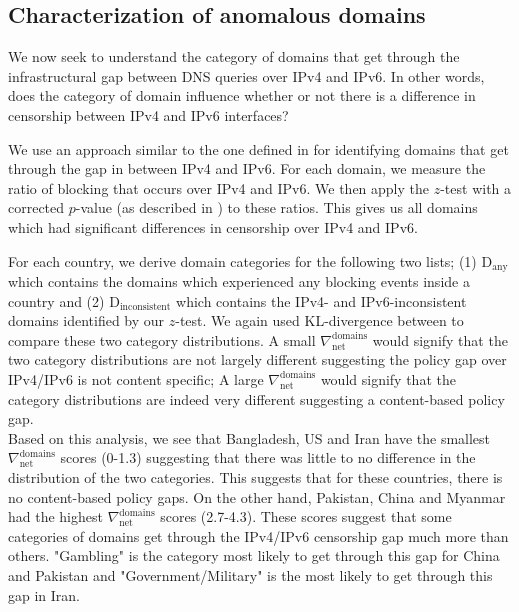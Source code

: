 \subsection{Characterization of anomalous domains}
\label{sec:v4vsv6-infrastructure:domains}
We now seek to understand the category of domains that get through the
infrastructural gap between DNS queries over IPv4 and IPv6. In other words,
does the category of domain influence whether or not there is a difference in
censorship between IPv4 and IPv6 interfaces?

We use an approach similar to the one defined in 
for identifying domains that get through the gap in between IPv4 and IPv6. For
each domain, we measure the ratio of blocking that occurs over IPv4 and IPv6. We
then apply the $z$-test with a corrected $p$-value (as described in
) to these ratios. This gives us all domains which
had significant differences in censorship over IPv4 and IPv6.

For each country, we derive domain categories for the following two lists; (1)
$\text{D}_{\text{any}}$ which contains the domains which experienced any
blocking events inside a country and (2) $\text{D}_{\text{inconsistent}}$ which
contains the IPv4- and IPv6-inconsistent domains identified by our $z$-test. We
again used KL-divergence between to compare these two category distributions. A
small $\nabla_{\text{net}}^{\text{domains}}$ would signify that the two
category distributions are not largely different suggesting the policy gap over
IPv4/IPv6 is not content specific; A large
$\nabla_{\text{net}}^{\text{domains}}$ would signify that the category
distributions are indeed very different suggesting a content-based policy gap.
\\
Based on this analysis, we see that Bangladesh, US and Iran have the smallest
$\nabla_{\text{net}}^{\text{domains}}$ scores (0-1.3) suggesting that there
was little to no difference in the distribution of the two categories. This
suggests that for these countries, there is no content-based policy gaps. On the
other hand, Pakistan, China and Myanmar had the highest
$\nabla_{\text{net}}^{\text{domains}}$ scores (2.7-4.3). These scores suggest
that some categories of domains get through the IPv4/IPv6 censorship gap much
more than others. "Gambling" is the category most likely to get through this gap
for China and Pakistan and "Government/Military" is the most likely to get
through this gap in Iran. 
